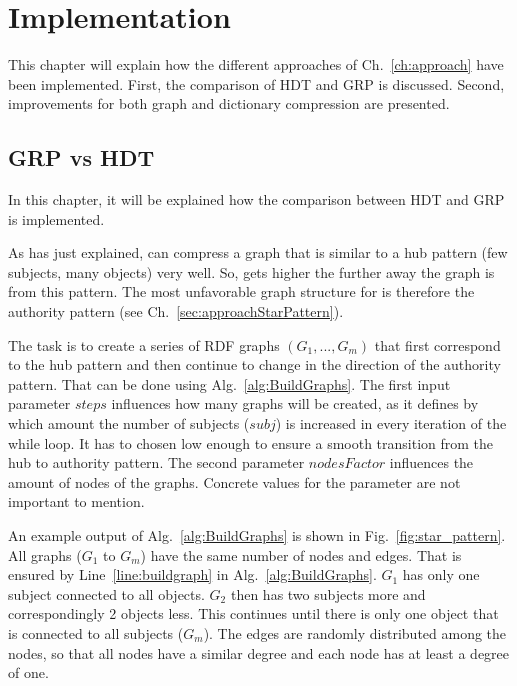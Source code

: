 \chapter{Implementation}\label{ch:implementation}

This chapter will explain how the different approaches of Ch.~\ref{ch:approach} have been implemented. First, the comparison of HDT and GRP is discussed. Second, improvements for both graph and dictionary compression are presented.

\section{GRP vs HDT}\label{sec:implementationGRPvsHDT}
In this chapter, it will be explained how the comparison between HDT and GRP is implemented.

As has just explained, \GHDT{} can compress a graph that is similar to a hub pattern (few subjects, many objects) very well. So,  gets higher the further away the graph is from this pattern. The most unfavorable graph structure for \GHDT{} is therefore the authority pattern (see Ch.~\ref{sec:approachStarPattern}).

The task is to create a series of RDF graphs $(G_1,...,G_m)$ that first correspond to the hub pattern and then continue to change in the direction of the authority pattern. That can be done using Alg.~\ref{alg:BuildGraphs}. The first input parameter $steps$ influences how many graphs will be created, as it defines by which amount the number of subjects ($subj$) is increased in every iteration of the while loop. It has to chosen low enough to ensure a smooth transition from the hub to authority pattern. The second parameter $nodesFactor$ influences the amount of nodes of the graphs. Concrete values for the parameter are not important to mention.

An example output of Alg.~\ref{alg:BuildGraphs} is shown in Fig.~\ref{fig:star_pattern}. All graphs ($G_1$ to $G_m$) have the same number of nodes and edges. That is ensured by Line~\ref{line:buildgraph} in Alg.~\ref{alg:BuildGraphs}. $G_1$ has only one subject connected to all objects. $G_2$ then has two subjects more and correspondingly 2 objects less. This continues until there is only one object that is connected to all subjects ($G_m$). The edges are randomly distributed among the nodes, so that all nodes have a similar degree and each node has at least a degree of one.

